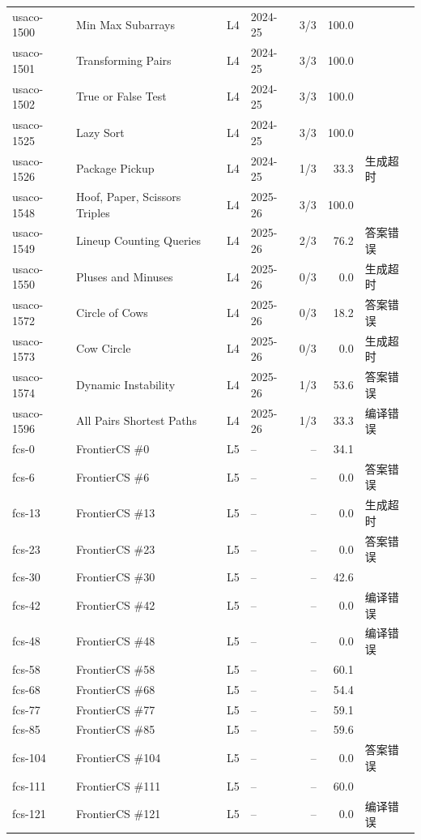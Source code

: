 \documentclass[11pt,a4paper,fontset=none]{ctexart}
\begin{document}
{\begin{longtable}{@{}l>{\raggedright\arraybackslash}p{3.4cm}llrr>{\raggedright\arraybackslash}p{3.1cm}@{}}
usaco-1500 & Min Max Subarrays & L4 & 2024-25 & 3/3 & 100.0 &  \\
usaco-1501 & Transforming Pairs & L4 & 2024-25 & 3/3 & 100.0 &  \\
usaco-1502 & True or False Test & L4 & 2024-25 & 3/3 & 100.0 &  \\
usaco-1525 & Lazy Sort & L4 & 2024-25 & 3/3 & 100.0 &  \\
usaco-1526 & Package Pickup & L4 & 2024-25 & 1/3 & 33.3 & 生成超时 \\
usaco-1548 & Hoof, Paper, Scissors Triples & L4 & 2025-26 & 3/3 & 100.0 &  \\
usaco-1549 & Lineup Counting Queries & L4 & 2025-26 & 2/3 & 76.2 & 答案错误 \\
usaco-1550 & Pluses and Minuses & L4 & 2025-26 & 0/3 & 0.0 & 生成超时 \\
usaco-1572 & Circle of Cows & L4 & 2025-26 & 0/3 & 18.2 & 答案错误 \\
usaco-1573 & Cow Circle & L4 & 2025-26 & 0/3 & 0.0 & 生成超时 \\
usaco-1574 & Dynamic Instability & L4 & 2025-26 & 1/3 & 53.6 & 答案错误 \\
usaco-1596 & All Pairs Shortest Paths & L4 & 2025-26 & 1/3 & 33.3 & 编译错误 \\
fcs-0 & FrontierCS \#0 & L5 & – & – & 34.1 &  \\
fcs-6 & FrontierCS \#6 & L5 & – & – & 0.0 & 答案错误 \\
fcs-13 & FrontierCS \#13 & L5 & – & – & 0.0 & 生成超时 \\
fcs-23 & FrontierCS \#23 & L5 & – & – & 0.0 & 答案错误 \\
fcs-30 & FrontierCS \#30 & L5 & – & – & 42.6 &  \\
fcs-42 & FrontierCS \#42 & L5 & – & – & 0.0 & 编译错误 \\
fcs-48 & FrontierCS \#48 & L5 & – & – & 0.0 & 编译错误 \\
fcs-58 & FrontierCS \#58 & L5 & – & – & 60.1 &  \\
fcs-68 & FrontierCS \#68 & L5 & – & – & 54.4 &  \\
fcs-77 & FrontierCS \#77 & L5 & – & – & 59.1 &  \\
fcs-85 & FrontierCS \#85 & L5 & – & – & 59.6 &  \\
fcs-104 & FrontierCS \#104 & L5 & – & – & 0.0 & 答案错误 \\
fcs-111 & FrontierCS \#111 & L5 & – & – & 60.0 &  \\
fcs-121 & FrontierCS \#121 & L5 & – & – & 0.0 & 编译错误 \\

\end{longtable}}
\end{document}
